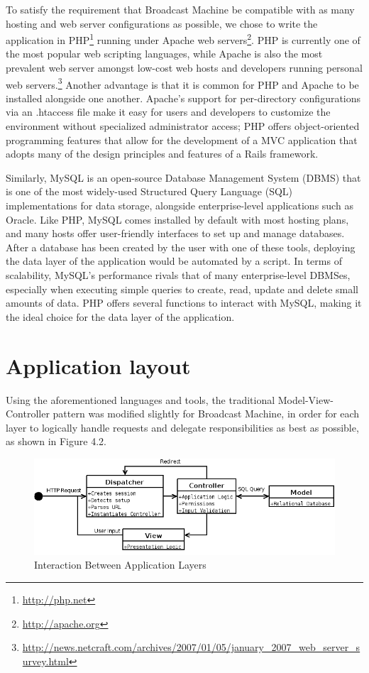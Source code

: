 \documentclass[a4paper,12pt]{report}
\begin{document}
To satisfy the requirement that Broadcast Machine be compatible with as many hosting and web server configurations as possible, we chose to write the application in PHP\footnote{\url{http://php.net}} running under Apache web servers\footnote{\url{http://apache.org}}. PHP is currently one of the most popular web scripting languages, while Apache is also the most prevalent web server amongst low-cost web hosts and developers running personal web servers.\footnote{\url{http://news.netcraft.com/archives/2007/01/05/january\_2007\_web\_server\_survey.html}}
Another advantage is that it is common for PHP and Apache to be installed alongside one another. Apache's support for per-directory configurations via an .htaccess file make it easy for users and developers to customize the environment without specialized administrator access; PHP offers object-oriented programming features that allow for the development of a MVC application that adopts many of the design principles and features of a Rails framework.

Similarly, MySQL is an open-source Database Management System (DBMS) that is one of the most widely-used Structured Query Language (SQL) implementations for data storage, alongside enterprise-level applications such as Oracle. Like PHP, MySQL comes installed by default with most hosting plans, and many hosts offer user-friendly interfaces to set up and manage databases. After a database has been created by the user with one of these tools, deploying the data layer of the application would be automated by a script. In terms of scalability, MySQL's performance rivals that of many enterprise-level DBMSes, especially when executing simple queries to create, read, update and delete small amounts of data. PHP offers several functions to interact with MySQL, making it the ideal choice for the data layer of the application.

\section{Application layout}
Using the aforementioned languages and tools, the traditional Model-View-Controller pattern was modified slightly for Broadcast Machine, in order for each layer to logically handle requests and delegate responsibilities as best as possible, as shown in Figure 4.2.

\begin{figure}[htp]
\begin{center}
\includegraphics[scale=0.5]{./images/flow.png}
\end{center}
\caption{Interaction Between Application Layers}
\end{figure}
\end{document}
